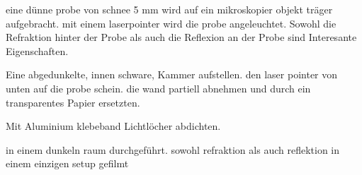 eine dünne probe von schnee 5 mm wird auf ein mikroskopier objekt träger aufgebracht. mit einem laserpointer wird die probe angeleuchtet. Sowohl die Refraktion hinter der Probe als auch die Reflexion an der Probe sind Interesante Eigenschaften.

Eine abgedunkelte, innen schware, Kammer aufstellen. den laser pointer von unten auf die probe schein. die wand partiell abnehmen und durch ein transparentes Papier ersetzten.

Mit Aluminium klebeband Lichtlöcher abdichten.

in einem dunkeln raum durchgeführt. sowohl refraktion als auch reflektion in einem einzigen setup gefilmt
